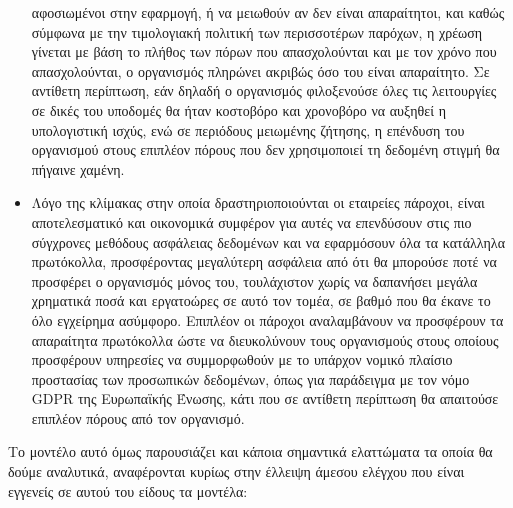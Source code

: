 \documentclass{article}
\begin{document}
\begin{itemize}
αφοσιωμένοι στην εφαρμογή, ή να μειωθούν αν δεν είναι απαραίτητοι, και
καθώς σύμφωνα με την τιμολογιακή πολιτική των περισσοτέρων παρόχων, η
χρέωση γίνεται με βάση το πλήθος των πόρων που απασχολούνται και με τον
χρόνο που απασχολούνται, ο οργανισμός πληρώνει ακριβώς όσο του είναι
απαραίτητο. Σε αντίθετη περίπτωση, εάν δηλαδή ο οργανισμός φιλοξενούσε
όλες τις λειτουργίες σε δικές του υποδομές θα ήταν κοστοβόρο και χρονοβόρο
να αυξηθεί η υπολογιστική ισχύς, ενώ σε περιόδους μειωμένης ζήτησης, η
επένδυση του οργανισμού στους επιπλέον πόρους που δεν χρησιμοποιεί τη
δεδομένη στιγμή θα πήγαινε χαμένη.
\item Λόγο της κλίμακας στην οποία δραστηριοποιούνται οι εταιρείες
πάροχοι, είναι αποτελεσματικό και οικονομικά συμφέρον για αυτές να
επενδύσουν στις πιο σύγχρονες μεθόδους ασφάλειας δεδομένων και να
εφαρμόσουν όλα τα κατάλληλα πρωτόκολλα, προσφέροντας μεγαλύτερη ασφάλεια
από ότι θα μπορούσε ποτέ να προσφέρει ο οργανισμός μόνος του, τουλάχιστον
χωρίς να δαπανήσει μεγάλα χρηματικά ποσά και εργατοώρες σε αυτό τον τομέα,
σε βαθμό που θα έκανε το όλο εγχείρημα ασύμφορο. Επιπλέον οι πάροχοι
αναλαμβάνουν να προσφέρουν τα απαραίτητα πρωτόκολλα ώστε να διευκολύνουν
τους οργανισμούς στους οποίους προσφέρουν υπηρεσίες να συμμορφωθούν με το
υπάρχον νομικό πλαίσιο προστασίας των προσωπικών δεδομένων, όπως για
παράδειγμα με τον νόμο GDPR
της Ευρωπαϊκής Ένωσης, κάτι που σε αντίθετη περίπτωση θα απαιτούσε
επιπλέον πόρους από τον οργανισμό.
\end{itemize}
Το μοντέλο αυτό όμως παρουσιάζει και κάποια σημαντικά ελαττώματα τα οποία
θα δούμε αναλυτικά, αναφέρονται κυρίως στην έλλειψη άμεσου ελέγχου που
είναι εγγενείς σε αυτού του είδους τα μοντέλα:
\end{document}
